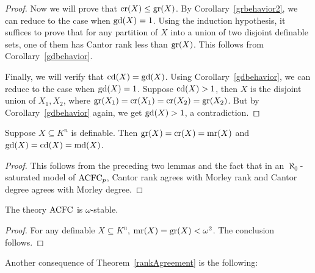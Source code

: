 \begin{proof}
Now we will prove that  $\mathrm{cr}(X) \leq \mathrm{gr}(X)$. By Corollary~\ref{grbehavior2}, we can reduce to the case when $\mathrm{gd}(X)=1$. Using the induction hypothesis, it suffices to prove that for any partition of $X$ into a union of two disjoint definable sets, one of them has Cantor rank less than $\mathrm{gr}(X)$. This follows from Corollary~\ref{gdbehavior}. 

Finally, we will verify that $\mathrm{cd}(X)=\mathrm{gd}(X)$. Using Corollary~\ref{gdbehavior}, we can reduce to the case when $\mathrm{gd}(X)=1$. Suppose $\mathrm{cd}(X)>1$, then $X$ is the disjoint union of $X_1, X_2$, where $\mathrm{gr}(X_1) =\mathrm{cr}(X_1)=\mathrm{cr}(X_2) =\mathrm{gr}(X_2)$. But by Corollary~\ref{gdbehavior} again, we get $\mathrm{gd}(X)>1$, a contradiction.
\end{proof}

\begin{thm} \label{rankAgreement}
Suppose $X \subseteq K^n$ is definable. Then $\mathrm{gr}(X) = \mathrm{cr}(X) =\mathrm{mr}(X)$ and $\mathrm{gd}(X)=\mathrm{cd}(X)=\mathrm{md}(X)$. 
\end{thm}

\begin{proof}
This follows from the preceding two lemmas and the fact that in an $\aleph_0$-saturated model of $\mathrm{ACFC}_p$, Cantor rank agrees with Morley rank and Cantor degree agrees with Morley degree.
\end{proof}


\begin{cor}
The theory $\mathrm{ACFC}$ is $\omega$-stable. 
\end{cor}

\begin{proof}
For any definable $X \subseteq K^n$, $\mathrm{mr}(X) = \mathrm{gr}(X) < \omega^2$. The conclusion follows.
\end{proof}
\newpage
\noindent
Another consequence of Theorem~\ref{rankAgreement} is the following:

